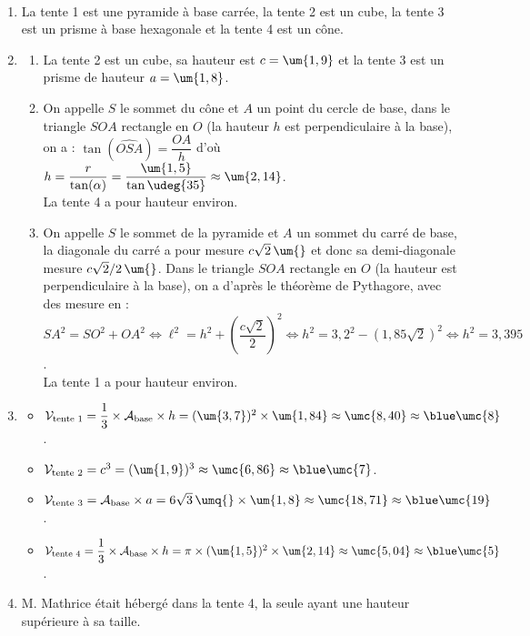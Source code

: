 \begin{corrige}
\ \\ [-5mm]
   \begin{enumerate}
      \item La tente 1 est une {\blue pyramide} à base carrée, la tente 2 est un {\blue cube}, la tente 3 est un {\blue prisme} à base hexagonale et la tente 4 est un {\blue cône.}
      \item
         \begin{enumerate}
            \item La tente 2 est un cube, sa hauteur est {\blue $c =\um{1,9}$} et la tente 3 est un prisme de hauteur {\blue $a =\um{1,8}$}.
            \item On appelle $S$ le sommet du cône et $A$ un point du cercle de base, dans le triangle $SOA$ rectangle en $O$ (la hauteur $h$ est perpendiculaire à la base), on a : $\tan(\widehat{OSA}) =\dfrac{OA}{h}$ d'où $h =\dfrac{r}{\tan(\alpha)} =\dfrac{\um{1,5}}{\tan{\udeg{35}}} \approx\um{2,14}$. \\ [1mm]
               La tente 4 a pour {\blue hauteur } environ.
            \item On appelle $S$ le sommet de la pyramide et $A$ un sommet du carré de base, la diagonale du carré a pour mesure $c\sqrt{2}\,\um{}$ et donc sa demi-diagonale mesure $c\sqrt{2}/2\,\um{}$. Dans le triangle $SOA$ rectangle en $O$ (la hauteur est perpendiculaire à la base), on a d'après le théorème de Pythagore, avec des mesure en \um{} : \\
               $SA^2 =SO^2+OA^2 \iff \ell^2 =h^2+\left(\dfrac{c\sqrt{2}}{2}\right)^2 \iff h^2 =3,2^2-(1,85\sqrt2)^2 \iff h^2 =3,395$. \\ [1mm]
               La tente 1 a pour {\blue hauteur } environ.
         \end{enumerate}
      \setcounter{enumi}{2}
      \item
         \begin{itemize}
            \item $\mathcal{V}_{\text{tente 1}} =\dfrac13\times\mathcal{A}_{\text{base}}\times h=(\um{3,7})^2\times\um{1,84} \approx\umc{8,40} \approx{\blue\umc{8}}$. \smallskip
            \item $\mathcal{V}_{\text{tente 2}} =c^3=(\um{1,9})^3 \approx\umc{6,86} \approx{\blue \umc{7}}$.
            \item $\mathcal{V}_{\text{tente 3}} =\mathcal{A}_{\text{base}}\times a=6\sqrt3\,\umq{}\times\um{1,8} \approx\umc{18,71} \approx{\blue \umc{19}}$. \smallskip
            \item $\mathcal{V}_{\text{tente 4}} =\dfrac13\times\mathcal{A}_{\text{base}}\times h=\pi\times(\um{1,5})^2\times\um{2,14} \approx\umc{5,04} \approx{\blue \umc{5}}$. \smallskip
         \end{itemize}
      \item M. Mathrice était hébergé dans la {\blue tente 4}, la seule ayant une hauteur supérieure à sa taille.
   \end{enumerate}
\end{corrige}


